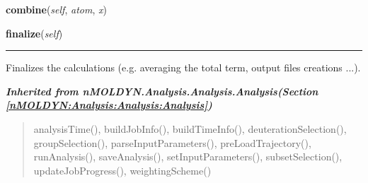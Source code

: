     \label{nMOLDYN:Analysis:Scattering:DynamicIncoherentStructureFactorAR:combine}

    \vspace{0.5ex}

\hspace{.8\funcindent}\begin{boxedminipage}{\funcwidth}

    \raggedright \textbf{combine}(\textit{self}, \textit{atom}, \textit{x})

\setlength{\parskip}{2ex}
\setlength{\parskip}{1ex}
    \end{boxedminipage}

    \label{nMOLDYN:Analysis:Scattering:DynamicIncoherentStructureFactorAR:finalize}

    \vspace{0.5ex}

\hspace{.8\funcindent}\begin{boxedminipage}{\funcwidth}

    \raggedright \textbf{finalize}(\textit{self})

    \vspace{-1.5ex}

    \rule{\textwidth}{0.5\fboxrule}
\setlength{\parskip}{2ex}
    Finalizes the calculations (e.g. averaging the total term, output files
    creations ...).

\setlength{\parskip}{1ex}
    \end{boxedminipage}


\large{\textbf{\textit{Inherited from nMOLDYN.Analysis.Analysis.Analysis\textit{(Section \ref{nMOLDYN:Analysis:Analysis:Analysis})}}}}

\begin{quote}
analysisTime(), buildJobInfo(), buildTimeInfo(), deuterationSelection(), groupSelection(), parseInputParameters(), preLoadTrajectory(), runAnalysis(), saveAnalysis(), setInputParameters(), subsetSelection(), updateJobProgress(), weightingScheme()
\end{quote}

